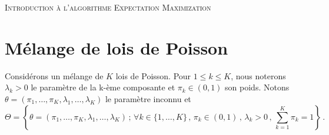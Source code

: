 \documentclass[a4paper,10pt,fleqn]{article}
\newcommand{\1}{\ensuremath{\mathbbm{1}}}
\begin{document}


\noindent\hrulefill

\begin{center}
\textsc{Introduction \`a l'algorithme Expectation Maximization}
\end{center}
\hrulefill

\section*{M\'elange de lois de Poisson}

Consid\'erons un m\'elange de $K$ lois de Poisson. Pour $1\leq k \leq K$, nous noterons $\lambda_k>0$ le param\`etre de la k-\`eme composante et $\pi_k\in(0,1)$ son poids. Notons $\theta = (\pi_1,\ldots,\pi_K,\lambda_1,\ldots,\lambda_K)$ le param\`etre inconnu et 
$$
\Theta = \left\{\theta = (\pi_1,\ldots,\pi_K,\lambda_1,\ldots,\lambda_K)\,;\, \forall k \in\{1,\ldots,K\}\,,\, \pi_k\in(0,1)\,,\,\lambda_k>0\,,\, \sum_{k=1}^K\pi_k = 1\right\}\,.
$$
\end{document}
